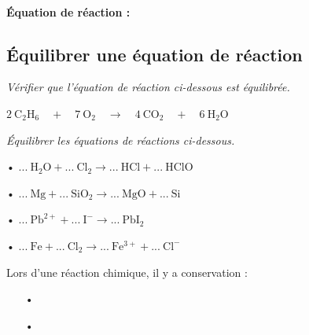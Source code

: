 \documentclass[12pt,a4paper,fleqn]{article}
\begin{document}
\paragraph{Équation de réaction :}

\begin{center}
\end{center}

\newpage
\subsection{Équilibrer une équation de réaction}

\emph{Vérifier que l'équation de réaction ci-dessous est équilibrée.}

\begin{center}
$\mathrm{2~C_2H_6 \quad + \quad 7~O_2 \quad \rightarrow \quad 4~CO_2 \quad + \quad 6~H_2O} $
\end{center}

\vspace{2cm}

\emph{Équilibrer les équations de réactions ci-dessous.}
\begin{multicols}{2}
\begin{enumerate}
\begin{spacing}{1.5}
\item[•] $\mathrm{...~H_2O + ...~Cl_2 \rightarrow ...~HCl + ...~HClO}$

\item[•] $\mathrm{...~Mg + ...~SiO_2\rightarrow ...~MgO + ...~Si} $

\item[•] $\mathrm{...~Pb^{2+} + ...~I^- \rightarrow ...~PbI_2}$

\item[•] $\mathrm{...~Fe + ...~ Cl_2 \rightarrow ...~Fe^{3+} + ...~Cl^-}$
\end{spacing}
\end{enumerate}
\end{multicols}

Lors d'une réaction chimique, il y a conservation :
\begin{spacing}{1.5}
\begin{itemize}
\item[•]

\item[•]
\end{itemize}
\end{spacing}
\end{document}
